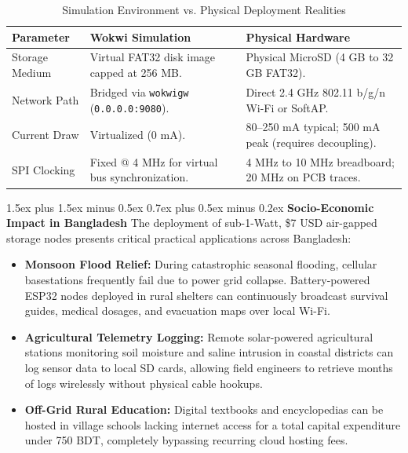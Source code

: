 ﻿\documentclass[conference]{IEEEtran}
\makeatletter
\renewcommand\section{\@startsection{section}{1}{\z@}%
  {1.5ex plus 1.5ex minus 0.5ex}%
  {0.7ex plus 0.5ex minus 0.2ex}%
  {\normalfont\normalsize\bfseries\centering}}
\makeatother
\begin{document}
\begin{table}[htbp]
\caption{Simulation Environment vs. Physical Deployment Realities}
\begin{center}
\begin{tabularx}{\columnwidth}{p{2.0cm}XX}
\toprule
\textbf{Parameter} & \textbf{Wokwi Simulation} & \textbf{Physical Hardware} \\
\midrule
Storage Medium & Virtual FAT32 disk image capped at 256 MB. & Physical MicroSD (4 GB to 32 GB FAT32). \\
\addlinespace
Network Path & Bridged via \texttt{wokwigw} (\texttt{0.0.0.0:9080}). & Direct 2.4 GHz 802.11 b/g/n Wi-Fi or SoftAP. \\
\addlinespace
Current Draw & Virtualized (0 mA). & 80--250 mA typical; 500 mA peak (requires decoupling). \\
\addlinespace
SPI Clocking & Fixed @ 4 MHz for virtual bus synchronization. & 4 MHz to 10 MHz breadboard; 20 MHz on PCB traces. \\
\bottomrule
\end{tabularx}
\label{tab:comparison}
\end{center}
\end{table}

\section{\textbf{Socio-Economic Impact in Bangladesh}}
The deployment of sub-1-Watt, \$7 USD air-gapped storage nodes presents critical practical applications across Bangladesh:
\begin{itemize}
    \item \textbf{Monsoon Flood Relief:} During catastrophic seasonal flooding, cellular basestations frequently fail due to power grid collapse. Battery-powered ESP32 nodes deployed in rural shelters can continuously broadcast survival guides, medical dosages, and evacuation maps over local Wi-Fi.
    \item \textbf{Agricultural Telemetry Logging:} Remote solar-powered agricultural stations monitoring soil moisture and saline intrusion in coastal districts can log sensor data to local SD cards, allowing field engineers to retrieve months of logs wirelessly without physical cable hookups.
    \item \textbf{Off-Grid Rural Education:} Digital textbooks and encyclopedias can be hosted in village schools lacking internet access for a total capital expenditure under 750 BDT, completely bypassing recurring cloud hosting fees.
\end{itemize}
\end{document}
